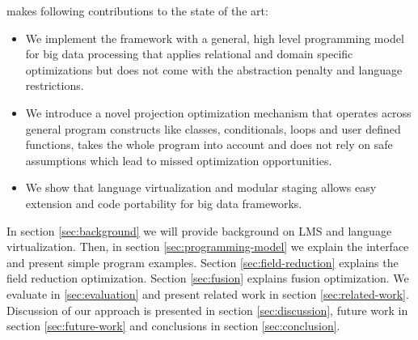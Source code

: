 \tool makes following contributions to the state of the art:    
\begin{itemize}

  \item We implement the \tool framework with a general, high level programming model for big data processing that applies relational and domain specific optimizations but does not come with the abstraction penalty and language restrictions.

  \item We introduce a novel projection optimization mechanism that operates across general program constructs like classes, conditionals, loops and user defined functions, takes the whole program into account and does not rely on safe assumptions which lead to missed optimization opportunities.


  \item We show that language virtualization and modular staging allows easy extension and code portability for big data frameworks. 
\end{itemize} 

In section \ref{sec:background} we will provide background on LMS and language virtualization. Then, in section \ref{sec:programming-model} we explain the interface and present simple program examples. Section \ref{sec:field-reduction} explains the field reduction optimization. Section \ref{sec:fusion} explains fusion optimization. We evaluate \tool in \ref{sec:evaluation} and present related work in section \ref{sec:related-work}. Discussion of our approach is presented in section \ref{sec:discussion}, future work in section \ref{sec:future-work} and conclusions in section \ref{sec:conclusion}.